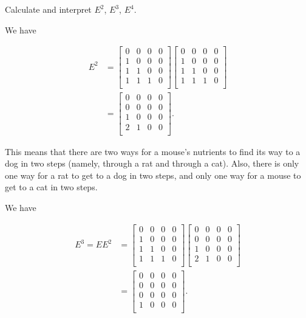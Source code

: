 \documentclass[../gatm_answers.tex]{subfiles}
\begin{document}
\begin{inner_problem}
\item Calculate and interpret $E^2$, $E^3$, $E^4$.
\end{inner_problem}

We have

\begin{align*}
E^2 &= \begin{bmatrix}
0 & 0 & 0 & 0 \\
1 & 0 & 0 & 0 \\
1 & 1 & 0 & 0 \\
1 & 1 & 1 & 0 \\
\end{bmatrix} \begin{bmatrix}
0 & 0 & 0 & 0 \\
1 & 0 & 0 & 0 \\
1 & 1 & 0 & 0 \\
1 & 1 & 1 & 0 \\
\end{bmatrix} \\
&= \begin{bmatrix}
0 & 0 & 0 & 0 \\
0 & 0 & 0 & 0 \\
1 & 0 & 0 & 0 \\
2 & 1 & 0 & 0 \\
\end{bmatrix}.
\end{align*}

This means that there are two ways for a mouse's nutrients to find its way to a dog in two steps (namely, through a rat and through a cat). Also, there is only one way for a rat to get to a dog in two steps, and only one way for a mouse to get to a cat in two steps.

We have

\begin{align*}
E^3 = EE^2 &= \begin{bmatrix}
0 & 0 & 0 & 0 \\
1 & 0 & 0 & 0 \\
1 & 1 & 0 & 0 \\
1 & 1 & 1 & 0 \\
\end{bmatrix}\begin{bmatrix}
0 & 0 & 0 & 0 \\
0 & 0 & 0 & 0 \\
1 & 0 & 0 & 0 \\
2 & 1 & 0 & 0 \\
\end{bmatrix} \\
&= \begin{bmatrix}
0 & 0 & 0 & 0 \\
0 & 0 & 0 & 0 \\
0 & 0 & 0 & 0 \\
1 & 0 & 0 & 0 \\
\end{bmatrix}.
\end{align*}
\end{document}
